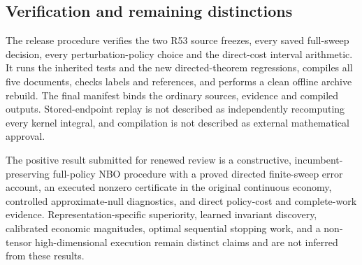 \hypertarget{verification-and-remaining-distinctions}{%
\subsection{Verification and remaining
distinctions}\label{verification-and-remaining-distinctions}}

The release procedure verifies the two R53 source freezes, every saved
full-sweep decision, every perturbation-policy choice and the
direct-cost interval arithmetic. It runs the inherited tests and the new
directed-theorem regressions, compiles all five documents, checks labels
and references, and performs a clean offline archive rebuild. The final
manifest binds the ordinary sources, evidence and compiled outputs.
Stored-endpoint replay is not described as independently recomputing
every kernel integral, and compilation is not described as external
mathematical approval.

The positive result submitted for renewed review is a constructive,
incumbent-preserving full-policy NBO procedure with a proved directed
finite-sweep error account, an executed nonzero certificate in the
original continuous economy, controlled approximate-null diagnostics,
and direct policy-cost and complete-work evidence.
Representation-specific superiority, learned invariant discovery,
calibrated economic magnitudes, optimal sequential stopping work, and a
non-tensor high-dimensional execution remain distinct claims and are not
inferred from these results.
